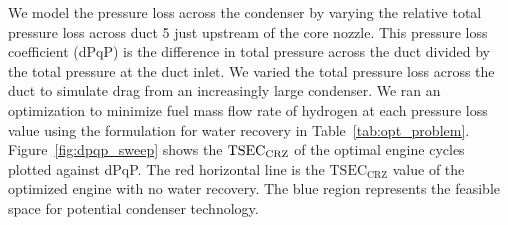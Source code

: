 \documentclass[conf]{new-aiaa}
\begin{document}
We model the pressure loss across the condenser by varying the relative total pressure loss across duct 5 just upstream of the core nozzle.
This pressure loss coefficient (dPqP) is the difference in total pressure across the duct divided by the total pressure at the duct inlet.
We varied the total pressure loss across the duct to simulate drag from an increasingly large condenser.
We ran an optimization to minimize fuel mass flow rate of hydrogen at each pressure loss value using the formulation for water recovery in Table~\ref{tab:opt_problem}.
Figure~\ref{fig:dpqp_sweep} shows the $\rm{TSEC}_{\rm{CRZ}}$ of the optimal engine cycles plotted against dPqP.
The red horizontal line is the $\text{TSEC}_\text{CRZ}$ value of the optimized engine with no water recovery.
The blue region represents the feasible space for potential condenser technology.
\end{document}
